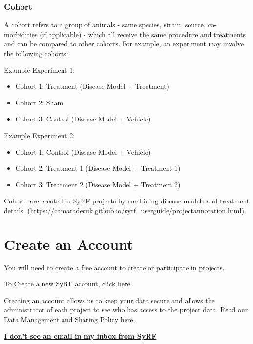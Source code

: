 \documentclass[
]{book}
\providecommand{\tightlist}{%
  \setlength{\itemsep}{0pt}\setlength{\parskip}{0pt}}
\begin{document}
\hypertarget{cohort}{%
\subsection{Cohort}\label{cohort}}

A cohort refers to a group of animals - same species, strain, source, co-morbidities (if applicable) - which all receive the same procedure and treatments and can be compared to other cohorts. For example, an experiment may involve the following cohorts:

Example Experiment 1:

\begin{itemize}
\tightlist
\item
  Cohort 1: Treatment (Disease Model + Treatment)
\item
  Cohort 2: Sham
\item
  Cohort 3: Control (Disease Model + Vehicle)
\end{itemize}

Example Experiment 2:

\begin{itemize}
\tightlist
\item
  Cohort 1: Control (Disease Model + Vehicle)
\item
  Cohort 2: Treatment 1 (Disease Model + Treatment 1)
\item
  Cohort 3: Treatment 2 (Disease Model + Treatment 2)
\end{itemize}

Cohorts are created in SyRF projects by combining disease models and treatment details.
(\url{https://camaradesuk.github.io/syrf_userguide/projectannotation.html}).

\hypertarget{createAccount}{%
\chapter{Create an Account}\label{createAccount}}

You will need to create a free account to create or participate in projects.

\href{https://syrf.org.uk}{To Create a new SyRF account, click here.}

Creating an account allows us to keep your data secure and allows the administrator of each project to see who has access to the project data. Read our \href{https://auth.syrf.org.uk/Privacy}{Data Management and Sharing Policy here}.

\href{https://syrf.org.uk/faq}{\textbf{I don't see an email in my inbox from SyRF}}
\end{document}
